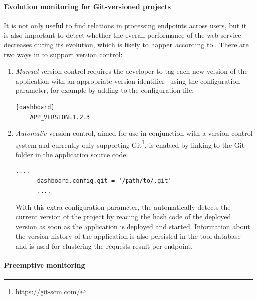 \documentclass[conference]{IEEEtran}
\begin{document}
  \paragraph{Evolution monitoring for Git-versioned projects}
  It is not only useful to find relations in processing endpoints across users, but it is also important to detect whether the overall performance of the web-service decreases during its evolution, which is likely to happen according to \cite{Kaminski:2006:DAW:1137677.1137694}. There are two ways in \tool to support version control: 

\begin{enumerate}
  \item  \textit{Manual} version control requires the developer to tag each new version of the application with an appropriate version identifier~\cite{papazoglou2011managing} using the  configuration parameter, for example by adding to the configuration file:
  
    \begin{lstlisting}[style=custompython,caption=Manually adding version control]
    [dashboard]
    APP_VERSION=1.2.3
    \end{lstlisting}


  \item \textit{Automatic} version control, aimed for use in conjunction with a version control system and currently only supporting Git\footnote{\url{https://git-scm.com/}}, is enabled by linking to the Git folder in the application source code: 
  
      \begin{lstlisting}[style=custompython]
      ....
      dashboard.config.git = '/path/to/.git'
      ....
      \end{lstlisting}  
  
    With this extra configuration parameter, the \tool automatically detects the current version of the project by reading the hash code of the deployed version as soon as the application is deployed and started. Information about the version history of the application is also persisted in the tool database and is used for clustering the requests result per endpoint.


\end{enumerate}
  
  \paragraph{Preemptive monitoring}
  
\end{document}
